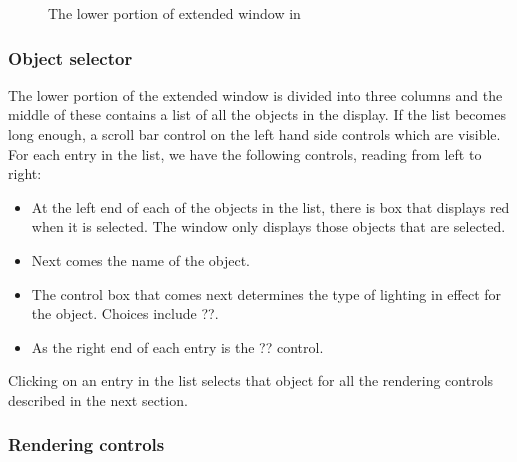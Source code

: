 \begin{figure}[htb]
  \begin{makeimage}
  \end{makeimage}
  \caption{\label{fig:extviewwindow} The lower portion of extended
    \viewer{} window in \SR{}} 
\end{figure}


\subsubsection{Object selector}

The lower portion of the extended \viewer{} window is divided into three
columns and the middle of these contains a list of all the objects in the
display.  If the list becomes long enough, a scroll bar control on the left
hand side controls which are visible.  For each entry in the list, we have
the following controls, reading from left to right:

\begin{itemize}
  \item At the left end of each of the
        objects in the list, there is box that displays red when it is
        selected.  The \viewer{} window only displays those objects that
        are selected.
  \item Next comes the name of the object.
  \item The control box that comes next determines the type of lighting in
        effect for the object.  Choices include ??.
  \item As the right end of each entry is the ?? control.
\end{itemize}

Clicking on an entry in the list selects that object for all the rendering
controls described in the next section.

\subsubsection{Rendering controls}

